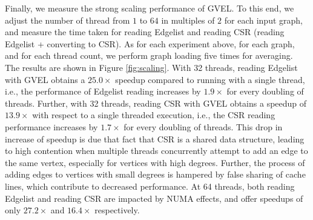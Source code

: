 Finally, we measure the strong scaling performance of GVEL. To this end, we adjust the number of thread from $1$ to $64$ in multiples of $2$ for each input graph, and measure the time taken for reading Edgelist and reading CSR (reading Edgelist + converting to CSR). As for each experiment above, for each graph, and for each thread count, we perform graph loading five times for averaging. The results are shown in Figure \ref{fig:scaling}. With 32 threads, reading Edgelist with GVEL obtains a $25.0\times$ speedup compared to running with a single thread, i.e., the performance of Edgelist reading increases by $1.9\times$ for every doubling of threads. Further, with 32 threads, reading CSR with GVEL obtains a speedup of $13.9\times$ with respect to a single threaded execution, i.e., the CSR reading performance increases by $1.7\times$ for every doubling of threads. This drop in increase of speedup is due that fact that CSR is a shared data structure, leading to high contention when multiple threads concurrently attempt to add an edge to the same vertex, especially for vertices with high degrees. Further, the process of adding edges to vertices with small degrees is hampered by false sharing of cache lines, which contribute to decreased performance. At 64 threads, both reading Edgelist and reading CSR are impacted by NUMA effects, and offer speedups of only $27.2\times$ and $16.4\times$ respectively.













